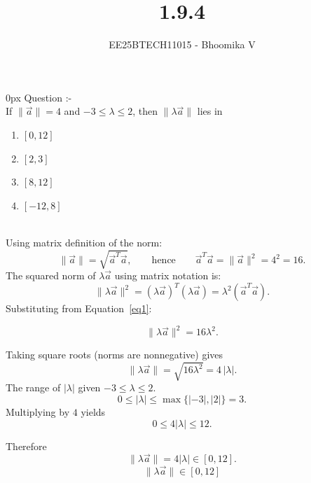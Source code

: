 \documentclass[journal]{IEEEtran}
\begin{document}

\vspace{3cm}

\title{1.9.4}
\author{EE25BTECH11015 - Bhoomika V}
{\let\newpage\relax\maketitle}

\renewcommand{\thefigure}{\theenumi}
\renewcommand{\thetable}{\theenumi}
\setlength{\intextsep}{10pt} %


\renewcommand{\thetable}{\theenumi}
\parindent 0px 
{Question :-} \\ 
If $\lVert \vec{a} \rVert = 4$ and $-3 \le \lambda \le 2$, then $\lVert \lambda \vec{a} \rVert$ lies in
\begin{enumerate}
  \item $[0,12]$
  \item $[2,3]$
  \item $[8,12]$
  \item $[-12,8]$
\end{enumerate} 
\vspace{0.5cm}

\solution \\

Using matrix definition of the norm:
\begin{equation}
  \|\vec{a}\| = \sqrt{\vec{a}^T \vec{a}}, 
  \qquad \text{hence} \qquad 
  \vec{a}^T \vec{a} = \|\vec{a}\|^2 = 4^2 = 16.
  \label{eq1}
\end{equation}
  The squared norm of \(\lambda \vec{a}\) using matrix notation is:
  \[
    \|\lambda \vec{a}\|^2 = (\lambda \vec{a})^T(\lambda \vec{a}) 
    = \lambda^2 (\vec{a}^T \vec{a}).
  \]
  Substituting from Equation~\eqref{eq1}:

  \[
    \|\lambda \vec{a}\|^2 = 16 \lambda^2.
  \]

  Taking square roots (norms are nonnegative) gives
  \[
    \|\lambda \vec{a}\| = \sqrt{16\lambda^2} = 4\,|\lambda|.
  \]  
  The range of \(|\lambda|\) given \(-3 \le \lambda \le 2\).
  \[
    0 \le |\lambda| \le \max\{|-3|,|2|\} = 3.
  \]
  Multiplying by \(4\) yields
  \[
    0 \le 4|\lambda| \le 12.
  \]

  Therefore
  \[
    \|\lambda \vec{a}\| = 4|\lambda| \in [0,12].
  \]
  \[
    \boxed{\; \|\lambda \vec{a}\| \in [0,12]\; }
  \]
\end{document}
